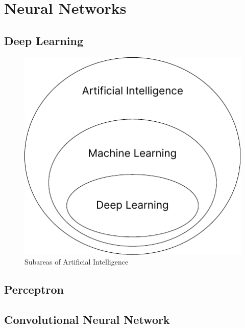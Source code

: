 \section{Neural Networks}

\subsection{Deep Learning}

\begin{figure}[H]
    \centering
    \includegraphics{figures/2methodology/nn/venn_dl.pdf}
    \caption{Subareas of Artificial Intelligence}
    \label{fig:venn_dl}
\end{figure}

\subsection{Perceptron}

\subsection{Convolutional Neural Network}